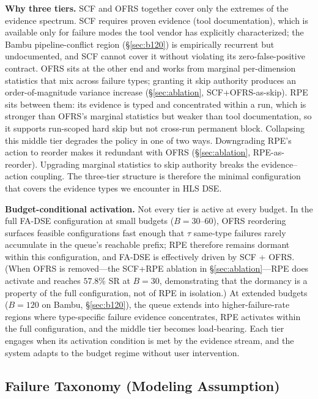 \documentclass[journal]{IEEEtran}
\begin{document}
\textbf{Why three tiers.} SCF and OFRS together cover only the extremes of the evidence spectrum. SCF requires proven evidence (tool documentation), which is available only for failure modes the tool vendor has explicitly characterized; the Bambu pipeline-conflict region (\S\ref{sec:b120}) is empirically recurrent but undocumented, and SCF cannot cover it without violating its zero-false-positive contract. OFRS sits at the other end and works from marginal per-dimension statistics that mix across failure types; granting it skip authority produces an order-of-magnitude variance increase (\S\ref{sec:ablation}, SCF+OFRS-as-skip). RPE sits between them: its evidence is typed and concentrated within a run, which is stronger than OFRS's marginal statistics but weaker than tool documentation, so it supports run-scoped hard skip but not cross-run permanent block. Collapsing this middle tier degrades the policy in one of two ways. Downgrading RPE's action to reorder makes it redundant with OFRS (\S\ref{sec:ablation}, RPE-as-reorder). Upgrading marginal statistics to skip authority breaks the evidence--action coupling. The three-tier structure is therefore the minimal configuration that covers the evidence types we encounter in HLS DSE.

\textbf{Budget-conditional activation.} Not every tier is active at every budget. In the full FA-DSE configuration at small budgets ($B{=}30$--$60$), OFRS reordering surfaces feasible configurations fast enough that $\tau$ same-type failures rarely accumulate in the queue's reachable prefix; RPE therefore remains dormant within this configuration, and FA-DSE is effectively driven by SCF + OFRS. (When OFRS is removed---the SCF+RPE ablation in \S\ref{sec:ablation}---RPE does activate and reaches $57.8\%$ SR at $B{=}30$, demonstrating that the dormancy is a property of the full configuration, not of RPE in isolation.) At extended budgets ($B{=}120$ on Bambu, \S\ref{sec:b120}), the queue extends into higher-failure-rate regions where type-specific failure evidence concentrates, RPE activates within the full configuration, and the middle tier becomes load-bearing. Each tier engages when its activation condition is met by the evidence stream, and the system adapts to the budget regime without user intervention.

\subsection{Failure Taxonomy (Modeling Assumption)}
\label{sec:taxonomy}
\end{document}
